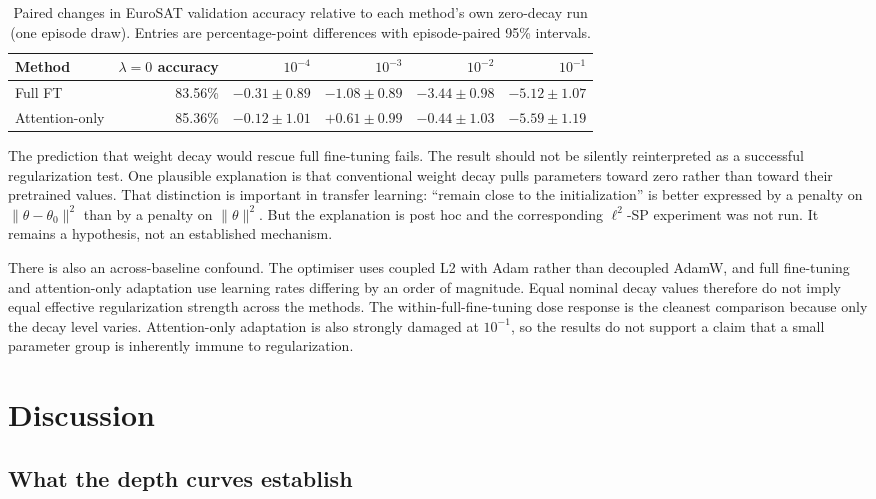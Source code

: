 \documentclass[11pt]{article}
\begin{document}
\begin{table}[t]
\centering
\small
\caption{Paired changes in EuroSAT validation accuracy relative to each method's own zero-decay run (one episode draw). Entries are percentage-point differences with episode-paired 95\% intervals.}
\label{tab:wd}
\begin{tabular}{lrrrrr}
\toprule
Method & $\lambda=0$ accuracy & $10^{-4}$ & $10^{-3}$ & $10^{-2}$ & $10^{-1}$\\
\midrule
Full FT & 83.56\% & $-0.31\pm0.89$ & $-1.08\pm0.89$ & $-3.44\pm0.98$ & $-5.12\pm1.07$\\
Attention-only & 85.36\% & $-0.12\pm1.01$ & $+0.61\pm0.99$ & $-0.44\pm1.03$ & $-5.59\pm1.19$\\
\bottomrule
\end{tabular}
\end{table}

The prediction that weight decay would rescue full fine-tuning fails. The result should not be silently reinterpreted as a successful regularization test. One plausible explanation is that conventional weight decay pulls parameters toward zero rather than toward their pretrained values. That distinction is important in transfer learning: “remain close to the initialization” is better expressed by a penalty on $\|\theta-\theta_0\|^2$ than by a penalty on $\|\theta\|^2$. But the explanation is post hoc and the corresponding $\ell^2$-SP experiment was not run. It remains a hypothesis, not an established mechanism.

There is also an across-baseline confound. The optimiser uses coupled L2 with Adam rather than decoupled AdamW, and full fine-tuning and attention-only adaptation use learning rates differing by an order of magnitude. Equal nominal decay values therefore do not imply equal effective regularization strength across the methods. The within-full-fine-tuning dose response is the cleanest comparison because only the decay level varies. Attention-only adaptation is also strongly damaged at $10^{-1}$, so the results do not support a claim that a small parameter group is inherently immune to regularization.

\section{Discussion}
\label{sec:discussion}

\subsection{What the depth curves establish}
\end{document}
